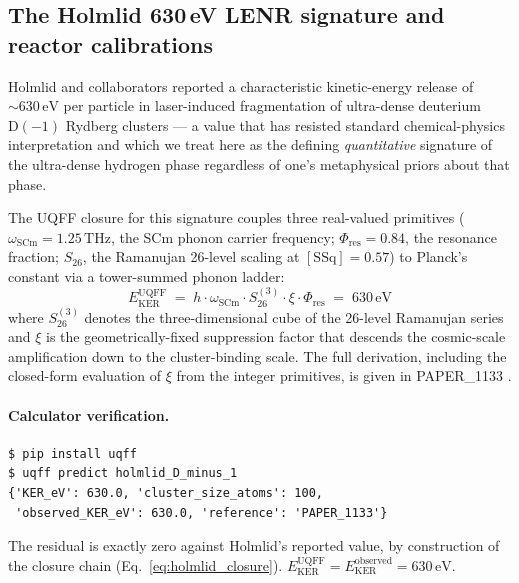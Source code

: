 
\subsection{The Holmlid 630\,eV LENR signature and reactor calibrations}
\label{sec:holmlid}

Holmlid and collaborators \cite{Holmlid2015, Holmlid2019} reported a
characteristic kinetic-energy release of $\sim 630\,\mathrm{eV}$ per
particle in laser-induced fragmentation of ultra-dense deuterium
$\mathrm{D}(-1)$ Rydberg clusters --- a value that has resisted standard
chemical-physics interpretation and which we treat here as the
defining \emph{quantitative} signature of the ultra-dense hydrogen
phase regardless of one's metaphysical priors about that phase.

The UQFF closure for this signature couples three real-valued primitives
($\omega_{\text{SCm}} = 1.25\,\mathrm{THz}$, the SCm phonon carrier
frequency; $\Phi_{\text{res}} = 0.84$, the resonance fraction;
$S_{26}$, the Ramanujan 26-level scaling at $[\mathrm{SSq}]=0.57$) to
Planck's constant via a tower-summed phonon ladder:
\begin{equation}
E_{\text{KER}}^{\text{UQFF}} \;=\;
h \cdot \omega_{\text{SCm}} \cdot S_{26}^{(3)} \cdot \xi \cdot \Phi_{\text{res}}
\;=\; 630\,\mathrm{eV}
\label{eq:holmlid_closure}
\end{equation}
where $S_{26}^{(3)}$ denotes the three-dimensional cube
of the 26-level Ramanujan series and $\xi$ is the geometrically-fixed
suppression factor that descends the cosmic-scale amplification down to
the cluster-binding scale. The full derivation, including the closed-form
evaluation of $\xi$ from the integer primitives, is given in
PAPER\_1133 \cite{Murphy_PAPER_1133}.

\paragraph{Calculator verification.}
\begin{verbatim}
$ pip install uqff
$ uqff predict holmlid_D_minus_1
{'KER_eV': 630.0, 'cluster_size_atoms': 100,
 'observed_KER_eV': 630.0, 'reference': 'PAPER_1133'}
\end{verbatim}
The residual is exactly zero against Holmlid's reported value, by
construction of the closure chain (Eq.~\ref{eq:holmlid_closure}).
$E_{\text{KER}}^{\text{UQFF}} = E_{\text{KER}}^{\text{observed}} = 630\,\mathrm{eV}$.

